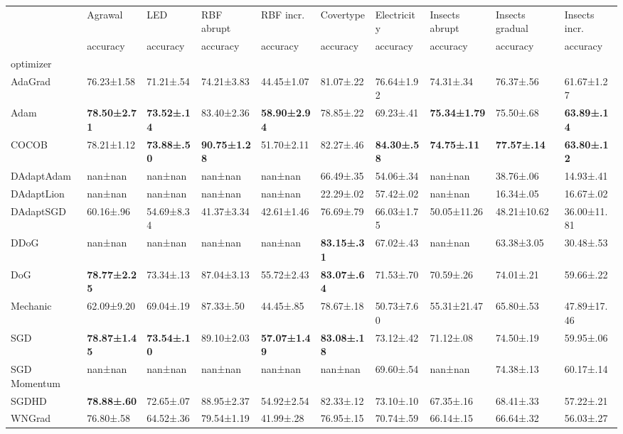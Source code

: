 \begin{tabular}{llllllllll}
\toprule
 & Agrawal & LED & RBF abrupt & RBF incr. & Covertype & Electricity & Insects abrupt & Insects gradual & Insects incr. \\
 & accuracy & accuracy & accuracy & accuracy & accuracy & accuracy & accuracy & accuracy & accuracy \\
optimizer &  &  &  &  &  &  &  &  &  \\
\midrule
AdaGrad & 76.23±1.58 & 71.21±.54 & 74.21±3.83 & 44.45±1.07 & 81.07±.22 & 76.64±1.92 & 74.31±.34 & 76.37±.56 & 61.67±1.27 \\
Adam & \bfseries 78.50±2.71 & \bfseries 73.52±.14 & 83.40±2.36 & \bfseries 58.90±2.94 & 78.85±.22 & 69.23±.41 & \bfseries 75.34±1.79 & 75.50±.68 & \bfseries 63.89±.14 \\
COCOB & 78.21±1.12 & \bfseries 73.88±.50 & \bfseries 90.75±1.28 & 51.70±2.11 & 82.27±.46 & \bfseries 84.30±.58 & \bfseries 74.75±.11 & \bfseries 77.57±.14 & \bfseries 63.80±.12 \\
DAdaptAdam & nan±nan & nan±nan & nan±nan & nan±nan & 66.49±.35 & 54.06±.34 & nan±nan & 38.76±.06 & 14.93±.41 \\
DAdaptLion & nan±nan & nan±nan & nan±nan & nan±nan & 22.29±.02 & 57.42±.02 & nan±nan & 16.34±.05 & 16.67±.02 \\
DAdaptSGD & 60.16±.96 & 54.69±8.34 & 41.37±3.34 & 42.61±1.46 & 76.69±.79 & 66.03±1.75 & 50.05±11.26 & 48.21±10.62 & 36.00±11.81 \\
DDoG & nan±nan & nan±nan & nan±nan & nan±nan & \bfseries 83.15±.31 & 67.02±.43 & nan±nan & 63.38±3.05 & 30.48±.53 \\
DoG & \bfseries 78.77±2.25 & 73.34±.13 & 87.04±3.13 & 55.72±2.43 & \bfseries 83.07±.64 & 71.53±.70 & 70.59±.26 & 74.01±.21 & 59.66±.22 \\
Mechanic & 62.09±9.20 & 69.04±.19 & 87.33±.50 & 44.45±.85 & 78.67±.18 & 50.73±7.60 & 55.31±21.47 & 65.80±.53 & 47.89±17.46 \\
SGD & \bfseries 78.87±1.45 & \bfseries 73.54±.10 & 89.10±2.03 & \bfseries 57.07±1.49 & \bfseries 83.08±.18 & 73.12±.42 & 71.12±.08 & 74.50±.19 & 59.95±.06 \\
SGD Momentum & nan±nan & nan±nan & nan±nan & nan±nan & nan±nan & 69.60±.54 & nan±nan & 74.38±.13 & 60.17±.14 \\
SGDHD & \bfseries 78.88±.60 & 72.65±.07 & 88.95±2.37 & 54.92±2.54 & 82.33±.12 & 73.10±.10 & 67.35±.16 & 68.41±.33 & 57.22±.21 \\
WNGrad & 76.80±.58 & 64.52±.36 & 79.54±1.19 & 41.99±.28 & 76.95±.15 & 70.74±.59 & 66.14±.15 & 66.64±.32 & 56.03±.27 \\
\bottomrule
\end{tabular}
